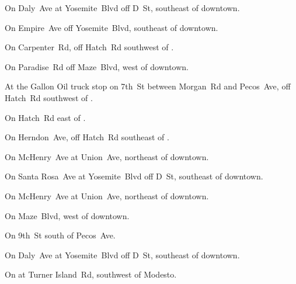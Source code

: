 
\begin{LocationList}

On Daly~Ave at  Yosemite~Blvd off D~St, southeast of downtown.

On Empire~Ave off  Yosemite~Blvd, southeast of downtown.

On Carpenter~Rd, off Hatch~Rd southwest of .

On Paradise~Rd off  Maze~Blvd, west of downtown.

At the Gallon Oil truck stop on 7th~St between Morgan~Rd and Pecos~Ave, off Hatch~Rd southwest of .

On Hatch~Rd east of .

On Herndon~Ave, off Hatch~Rd southeast of .

On  McHenry~Ave at Union~Ave, northeast of downtown.

On Santa Rosa~Ave at  Yosemite~Blvd off D~St, southeast of downtown.

On  McHenry~Ave at Union~Ave, northeast of downtown.

On  Maze~Blvd, west of downtown.

\Location{\TruckService \Rest \Service}
On 9th~St south of Pecos~Ave.

On Daly~Ave at  Yosemite~Blvd off D~St, southeast of downtown.

On  at Turner Island~Rd, southwest of Modesto.

\end{LocationList}
